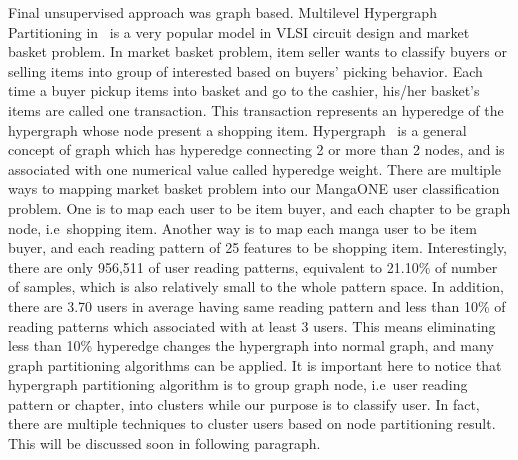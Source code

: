 \documentclass[English]{dicomopapers}
\begin{document}
Final unsupervised approach was graph based. Multilevel Hypergraph Partitioning in~\cite{karypis1999multilevel} is a very popular model in VLSI circuit design and market basket problem. In market basket problem, item seller wants to classify buyers or selling items into group of interested based on buyers' picking behavior. Each time a buyer pickup items into basket and go to the cashier, his/her basket's items are called one transaction. This transaction represents an hyperedge of the hypergraph whose node present a shopping item. Hypergraph~\cite{berge1973graphs} is a general concept of graph which has hyperedge connecting 2 or more than 2 nodes, and is associated with one numerical value called hyperedge weight. There are multiple ways to mapping market basket problem into our MangaONE user classification problem. One is to map each user to be item buyer, and each chapter to be graph node, i.e\ shopping item. Another way is to map each manga user to be item buyer, and each reading pattern of 25 features to be shopping item. Interestingly, there are only 956,511 of user reading patterns, equivalent to 21.10\% of number of samples, which is also relatively small to the whole pattern space. In addition, there are 3.70 users in average having same reading pattern and less than 10\% of reading patterns which associated with at least 3 users. This means eliminating less than 10\% hyperedge changes the hypergraph into normal graph, and many graph partitioning algorithms can be applied. It is important here to notice that hypergraph partitioning algorithm is to group graph node, i.e\ user reading pattern or chapter, into clusters while our purpose is to classify user. In fact, there are multiple techniques to cluster users based on node partitioning result. This will be discussed soon in following paragraph.\newline
\end{document}

